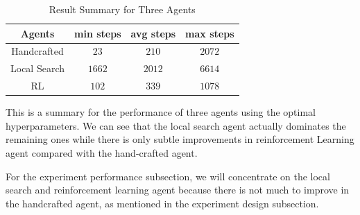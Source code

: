 \documentclass[letterpaper]{article} %
\begin{document}
\begin{table}[h!]
  \centering
  \normalsize{
    \begin{tabular}{ cccc } 
      \hline
      Agents & min steps & avg steps & max steps  \\ 
      \hline
      \hline
      Handcrafted & $23$ & $210$ & $2072$ \\ 
      Local Search & $1662$ & $2012$ & $6614$\\ 
      RL & $102$ & $339$ & $1078$\\
       \hline
      \end{tabular}}
  \caption{Result Summary for Three Agents}
  \medskip
  \footnotesize
  This is a summary for the performance of three agents using the optimal hyperparameters. We can see that the local search agent actually dominates the remaining ones while there is only subtle improvements in reinforcement Learning agent compared with the hand-crafted agent.
  \label{tab:resultsSummary}
\end{table} 

For the experiment performance subsection, we will concentrate on the local search and reinforcement learning agent because there is not much to improve in the handcrafted agent, as mentioned in the experiment design subsection. 
\end{document}
